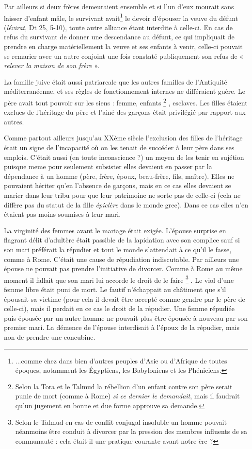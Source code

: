 Par ailleurs si deux frères demeuraient ensemble et si l'un d'eux  mourait sans laisser d'enfant mâle, le survivant avait\footnote{...comme chez dans bien d'autres peuples d'Asie ou d'Afrique de toutes époques, notamment les Égyptiens, les Babyloniens et les Phéniciens.} le devoir d'épouser la veuve du défunt (\emph{lévirat}, Dt 25, 5-10), toute autre alliance étant interdite à celle-ci. En cas de refus du survivant de donner une descendance au défunt, ce qui impliquait de prendre en charge matériellement la veuve et ses enfants à venir, celle-ci pouvait se remarier avec un autre conjoint une fois constaté publiquement son refus de « \emph{relever la maison de son frère} ». 

La famille juive était aussi patriarcale que les autres familles de l'Antiquité méditerranéenne, et ses règles de fonctionnement internes ne différaient guère. Le père avait tout pouvoir sur les siens : femme, enfants%
\footnote{Selon la Tora et le Talmud la rébellion d'un enfant contre son père serait punie de mort (comme à Rome) \emph{si ce dernier le demandait}, mais il faudrait qu'un jugement en bonne et due forme approuve sa demande.}%
, esclaves. Les filles étaient exclues de l'héritage du père et l'ainé des garçons était privilégié par rapport aux autres. 

Comme partout ailleurs jusqu'au XXème siècle l'exclusion des filles de l'héritage était un signe de l'incapacité où on les tenait de succéder à leur père dans ses emplois. C'était aussi (en toute inconscience ?) un moyen de les tenir en sujétion puisque meme pour seulement subsister elles devaient en passer par la dépendance à un homme (père, frère, époux, beau-frère, fils, maître). Elles ne pouvaient hériter qu'en l'absence de garçons, mais en ce cas elles devaient se marier dans leur tribu pour que leur patrimoine ne sorte pas de celle-ci (cela ne diffère pas du statut de la fille \emph{épiclère} dans le monde grec). Dans ce cas elles n'en étaient pas moins soumises à leur mari. 



La virginité des femmes avant le mariage était exigée. L'épouse surprise en flagrant délit d'adultère était passible de la lapidation avec son complice sauf si son mari préférait la répudier et tout le monde s'attendait à ce qu'il le fasse, comme à Rome. C'était une cause de répudiation indiscutable. Par ailleurs une épouse ne pouvait pas prendre l'initiative de divorcer. Comme à Rome au même moment il fallait que son mari lui accorde le droit de le faire%
\footnote{Selon le Talmud en cas de conflit conjugal insoluble un homme pouvait néanmoins être conduit à divorcer par la pression des membres influents de sa communauté : cela était-il une pratique courante avant notre ère ?}%
. Le viol d'une femme libre était puni de mort. Le fautif n'échappait au châtiment que s'il épousait sa victime (pour cela il devait être accepté comme gendre par le père de celle-ci), mais il perdait en ce cas le droit de la répudier. Une femme répudiée puis épousée par un autre homme ne pouvait plus être épousée à nouveau par son premier mari. La démence de l'épouse interdisait à l'époux de la répudier, mais non de prendre une concubine. 



